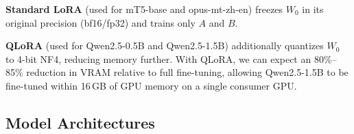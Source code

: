     \textbf{Standard LoRA} (used for mT5-base and opus-mt-zh-en) freezes $W_0$ in its original precision (bf16/fp32) and trains only $A$ and $B$.

    \textbf{QLoRA} (used for Qwen2.5-0.5B and Qwen2.5-1.5B) additionally quantizes $W_0$ to 4-bit NF4, reducing memory further. With QLoRA, we can expect an 80\%--85\% reduction in VRAM relative to full fine-tuning, allowing Qwen2.5-1.5B to be fine-tuned within 16\,GB of GPU memory on a single consumer GPU.

    \subsection{Model Architectures}

